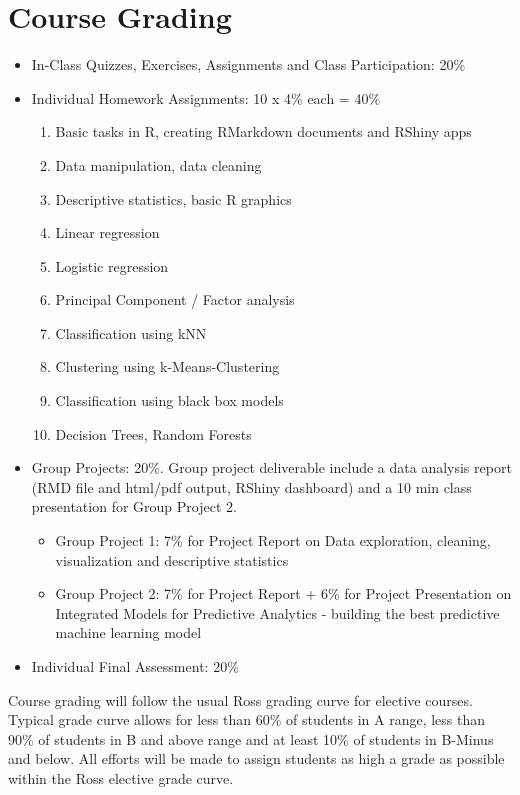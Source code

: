 \documentclass[11pt, letterpaper, twoside]{memoir}\usepackage{knitr}
\begin{document}
\section{Course Grading}
\begin{itemize}
\item In-Class Quizzes, Exercises, Assignments and Class Participation: 20\%

\item Individual Homework Assignments: 10 x 4\% each = 40\%
\begin{enumerate}
    \item Basic tasks in R, creating RMarkdown documents and RShiny apps
    \item Data manipulation, data cleaning
    \item Descriptive statistics, basic R graphics
    \item Linear regression
    \item Logistic regression
    \item Principal Component / Factor analysis
    \item Classification using kNN
    \item Clustering using k-Means-Clustering
    \item Classification using black box models
    \item Decision Trees, Random Forests
\end{enumerate}
\item Group Projects: 20\%. Group project deliverable include a data analysis report (RMD file and html/pdf output, RShiny dashboard) and a 10 min class presentation for Group Project 2.  
\begin{itemize}
    \item Group Project 1: 7\% for Project Report on Data exploration, cleaning, visualization and descriptive statistics
    \item Group Project 2: 7\% for Project Report + 6\% for Project Presentation on Integrated Models for Predictive Analytics - building the best predictive machine learning model
\end{itemize}    
\item Individual Final Assessment: 20\%
\end{itemize}    

Course grading will follow the usual Ross grading curve for elective courses. Typical grade curve allows for less than 60\% of students in A range, less than 90\% of students in B and above range and at least 10\% of students in B-Minus and below. All efforts will be made to assign students as high a grade as possible within the Ross elective grade curve.
\end{document}
